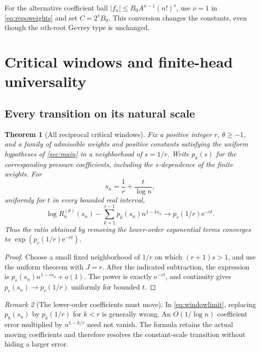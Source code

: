 \documentclass[11pt,a4paper]{article}
\newtheorem{theorem}{Theorem}[section]
\theoremstyle{definition}
\theoremstyle{remark}
\newtheorem{remark}[theorem]{Remark}
\newcommand{\ee}{\mathrm e}
\numberwithin{equation}{section}
\begin{document}
For the alternative coefficient ball
$|f_n|\le B_0 A^{n-1}(n!)^s$, use $\nu=1$ in
\eqref{eq:repoweights} and set $C=2^sB_0$.
This conversion changes the constants, even though the $n$th-root
Gevrey type is unchanged.

\section{Critical windows and finite-head universality}\label{sec:universality}

\subsection{Every transition on its natural scale}
\begin{theorem}[All reciprocal critical windows]\label{thm:windows}
Fix a positive integer $r$, $\theta\ge-1$, and a family of admissible
weights and positive constants satisfying the uniform hypotheses of
\cref{sec:main} in a neighborhood of $s=1/r$. Write
$p_k(s)$ for the corresponding pressure coefficients, including the
$s$-dependence of the finite weights. For
\begin{equation}
 s_n=\frac1r+\frac{t}{\log n},
 \label{eq:window}
\end{equation}
uniformly for $t$ in every bounded real interval,
\begin{equation}
 \log R_n^{(\theta)}(s_n)
 -\sum_{k=1}^{r-1}p_k(s_n)n^{1-ks_n}
 \longrightarrow p_r(1/r)\ee^{-rt}.
 \label{eq:windowlimit}
\end{equation}
Thus the ratio obtained by removing the lower-order exponential terms
converges to $\exp(p_r(1/r)\ee^{-rt})$.
\end{theorem}
\begin{proof}
Choose a small fixed neighborhood of $1/r$ on which
$(r+1)s>1$, and use the uniform theorem with $J=r$.
After the indicated subtraction, the expression is
$p_r(s_n)n^{1-rs_n}+o(1)$. The power is exactly $\ee^{-rt}$,
and continuity gives $p_r(s_n)\to p_r(1/r)$ uniformly for bounded $t$.
\end{proof}

\begin{remark}[The lower-order coefficients must move]
In \eqref{eq:windowlimit}, replacing $p_k(s_n)$ by $p_k(1/r)$ for
$k<r$ is generally wrong. An $O(1/\log n)$ coefficient error multiplied
by $n^{1-k/r}$ need not vanish. The formula retains the actual moving
coefficients and therefore resolves the constant-scale transition
without hiding a larger error.
\end{remark}
\end{document}
